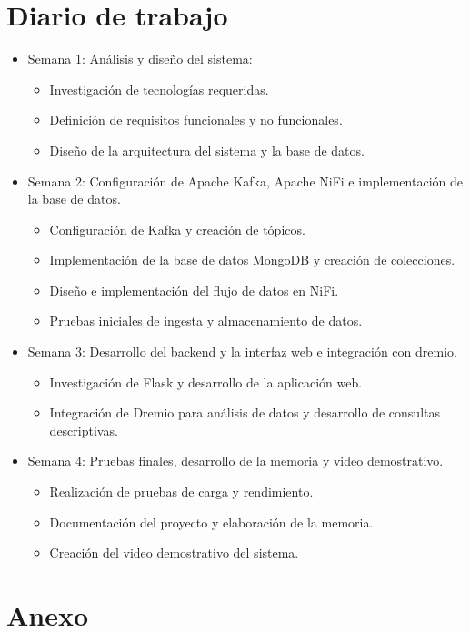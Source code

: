 \documentclass{../../../miPlantilla}
\begin{document}
\section{Diario de trabajo}
\begin{itemize}
  \item Semana 1: Análisis y diseño del sistema:
  \begin{itemize}
    \item Investigación de tecnologías requeridas.
    \item Definición de requisitos funcionales y no funcionales.
    \item Diseño de la arquitectura del sistema y la base de datos.
  \end{itemize}
  \item Semana 2: Configuración de Apache Kafka, Apache NiFi e implementación de la base de datos.
  \begin{itemize}
    \item Configuración de Kafka y creación de tópicos.
    \item Implementación de la base de datos MongoDB y creación de colecciones.
    \item Diseño e implementación del flujo de datos en NiFi.
    \item Pruebas iniciales de ingesta y almacenamiento de datos.
  \end{itemize}
  \item Semana 3: Desarrollo del backend y la interfaz web e integración con dremio.
  \begin{itemize}
    \item Investigación de Flask y desarrollo de la aplicación web.
    \item Integración de Dremio para análisis de datos y desarrollo de consultas descriptivas.
  \end{itemize}
  \item Semana 4: Pruebas finales, desarrollo de la memoria y video demostrativo.
  \begin{itemize}
    \item Realización de pruebas de carga y rendimiento.
    \item Documentación del proyecto y elaboración de la memoria.
    \item Creación del video demostrativo del sistema.
  \end{itemize}
\end{itemize}

\section{Anexo}
\end{document}
